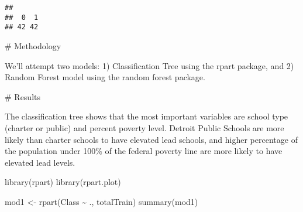 \documentclass[
]{article}
\newenvironment{Shaded}{\begin{snugshade}}{\end{snugshade}}
\newcommand{\FunctionTok}[1]{\textcolor[rgb]{0.00,0.00,0.00}{#1}}
\newcommand{\NormalTok}[1]{#1}
\newcommand{\OtherTok}[1]{\textcolor[rgb]{0.56,0.35,0.01}{#1}}
\newcommand{\SpecialCharTok}[1]{\textcolor[rgb]{0.00,0.00,0.00}{#1}}
\begin{document}
\begin{verbatim}
## 
##  0  1 
## 42 42
\end{verbatim}

\# Methodology

We'll attempt two models: 1) Classification Tree using the rpart
package, and 2) Random Forest model using the random forest package.

\# Results

The classification tree shows that the most important variables are
school type (charter or public) and percent poverty level. Detroit
Public Schools are more likely than charter schools to have elevated
lead schools, and higher percentage of the population under 100\% of the
federal poverty line are more likely to have elevated lead levels.

\begin{Shaded}
\begin{Highlighting}[]
\FunctionTok{library}\NormalTok{(rpart)}
\FunctionTok{library}\NormalTok{(rpart.plot)}

\NormalTok{mod1 }\OtherTok{\textless{}{-}} \FunctionTok{rpart}\NormalTok{(Class }\SpecialCharTok{\textasciitilde{}}\NormalTok{ ., totalTrain)}
\FunctionTok{summary}\NormalTok{(mod1)}
\end{Highlighting}
\end{Shaded}
\end{document}
